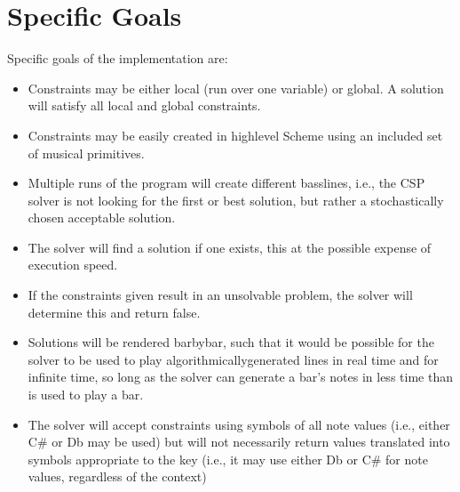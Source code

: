 \documentclass[letterpaper,10pt,english]{sphinxmanual}
\begin{document}
\chapter{Specific Goals}
\label{\detokenize{index:specific-goals}}
\sphinxAtStartPar
Specific goals of the implementation are:
\begin{itemize}
\item {} 
\sphinxAtStartPar
Constraints may be either local (run over one variable) or global. A solution will satisfy all local and global constraints.

\item {} 
\sphinxAtStartPar
Constraints may be easily created in high\sphinxhyphen{}level Scheme using an included set of musical primitives.

\item {} 
\sphinxAtStartPar
Multiple runs of the program will create different bass\sphinxhyphen{}lines, i.e., the CSP solver is
not looking for the first or best solution, but rather a stochastically chosen acceptable solution.

\item {} 
\sphinxAtStartPar
The solver will find a solution if one exists, this at the possible expense of execution speed.

\item {} 
\sphinxAtStartPar
If the constraints given result in an unsolvable problem, the solver will determine this and return false.

\item {} 
\sphinxAtStartPar
Solutions will be rendered bar\sphinxhyphen{}by\sphinxhyphen{}bar, such that it would be possible for the solver to be used
to play algorithmically\sphinxhyphen{}generated lines in real time and for infinite time, so long as the solver
can generate a bar’s notes in less time than is used to play a bar.

\item {} 
\sphinxAtStartPar
The solver will accept constraints using symbols of all note values (i.e., either C\# or Db may be used)
but will not necessarily return values translated into symbols appropriate to the key (i.e., it may
use either Db or C\# for note values, regardless of the context)

\end{itemize}
\end{document}
